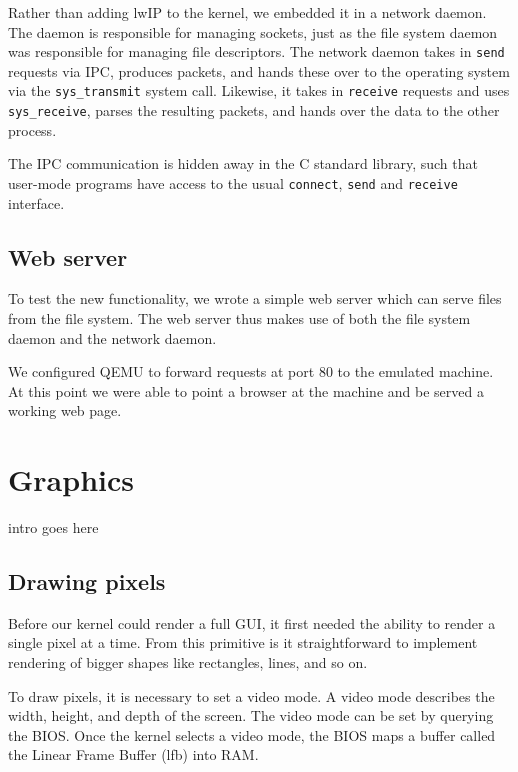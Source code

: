 \documentclass{article}
\begin{document}
Rather than adding lwIP to the kernel, we embedded it in a network daemon. The
daemon is responsible for managing sockets, just as the file system daemon was
responsible for managing file descriptors. The network daemon takes in
\texttt{send} requests via IPC, produces packets, and hands these over to the
operating system via the \texttt{sys\_transmit} system call. Likewise, it
takes in \texttt{receive} requests and uses \texttt{sys\_receive}, parses the
resulting packets, and hands over the data to the other process.

The IPC communication is hidden away in the C standard library, such that
user-mode programs have access to the usual \texttt{connect}, \texttt{send}
and \texttt{receive} interface.



\subsection{Web server}
To test the new functionality, we wrote a simple web server which can serve
files from the file system. The web server thus makes use of both the file
system daemon and the network daemon. 

We configured QEMU to forward requests at port 80 to the emulated machine. At
this point we were able to point a browser at the machine and be served a
working web page.








\section{Graphics}
\label{sec:graphics}


intro goes here

\subsection{Drawing pixels}
Before our kernel could render a full GUI, it first needed the ability
to render a single pixel at a time. From this primitive is it straightforward
to implement rendering of bigger shapes like rectangles, lines, and so on.

To draw pixels, it is necessary to set a video mode. A video mode describes
the width, height, and depth of the screen. The video mode can be set by
querying the BIOS. Once the kernel selects a video mode, the BIOS maps a
buffer called the Linear Frame Buffer (\gls{lfb}) into RAM. 
\end{document}
